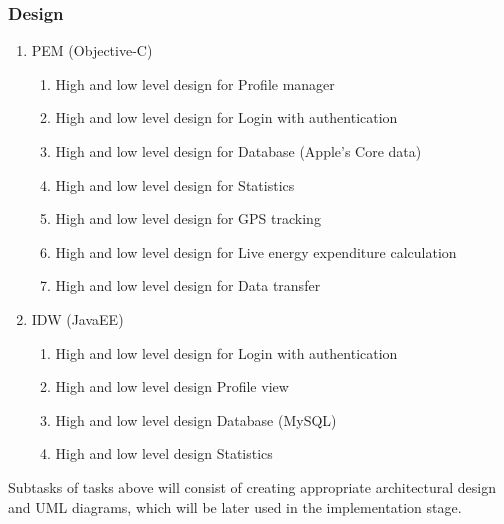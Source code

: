 \documentclass[12pt, a4paper]{report}   %
\begin{document}
\subsubsection{Design}
\begin{enumerate}
	\item PEM (Objective-C)
		\begin{enumerate}
			\item High and low level design for Profile manager
			\item High and low level design for Login with authentication
			\item High and low level design for Database (Apple’s Core data)
			\item High and low level design for Statistics
			\item High and low level design for GPS tracking
			\item High and low level design for Live energy expenditure calculation
			\item High and low level design for Data transfer
		\end{enumerate}
	\item IDW (JavaEE)
		\begin{enumerate}
			\item High and low level design for Login with authentication
			\item High and low level design Profile view
			\item High and low level design Database (MySQL)
			\item High and low level design Statistics
		\end{enumerate}
\end{enumerate}
Subtasks of tasks above will consist of creating appropriate architectural design and UML diagrams, which will be later used in the implementation stage.

\end{document}
